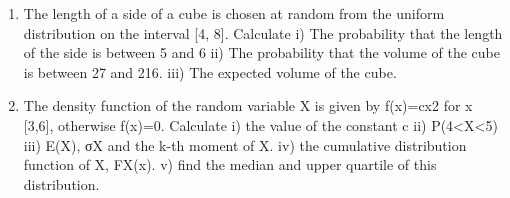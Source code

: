 \documentclass[]{report}
\begin{document}
\begin{enumerate}	
\item The length of a side of a cube is chosen at random from the uniform distribution on 	the interval [4, 8]. Calculate
i)	The probability that the length of the side is between 5 and 6
ii)	The probability that the volume of the cube is between 27 and 216.
iii)	The expected volume of the cube.

\item The density function of the random variable X is given by f(x)=cx2 for x [3,6], 	otherwise f(x)=0. Calculate
i)	the value of the constant c
ii)	P(4<X<5)
iii)	E(X), σX and the k-th moment of X.
iv)	the cumulative distribution function of X, FX(x).
v)	find the median and upper quartile of this distribution.	

\end{enumerate}
\end{document}
